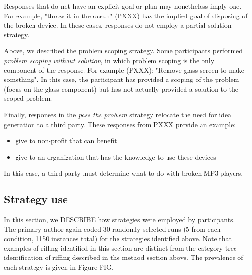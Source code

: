 Responses that do not have an explicit goal or plan may nonetheless imply one. For example, "throw it in the ocean" (PXXX) has the implied goal of disposing of the broken device. In these cases, responses do not employ a partial solution strategy.

Above, we described the problem scoping strategy. Some participants performed \emph{problem scoping without solution}, in which problem scoping is the only component of the response.
For example (PXXX): "Remove glass screen to make something". In this case, the participant has provided a scoping of the problem (focus on the glass component) but has not actually provided a solution to the scoped problem.

Finally, responses in the \emph{pass the problem} strategy relocate the need for idea generation to a third party. These responses from PXXX provide an example:

\begin{itemize}
    \item give to non-profit that can benefit
    \item give to an organization that has the knowledge to use these devices
\end{itemize}

In this case, a third party must determine what to do with broken MP3 players.

\subsection{Strategy use}

In this section, we DESCRIBE how strategies were employed by participants. The primary author again coded 30 randomly selected runs (5 from each condition, 1150 instances total) for the strategies identified above. Note that examples of riffing identified in this section are distinct from the category tree identification of riffing described in the method section above. The prevalence of each strategy is given in Figure FIG.

